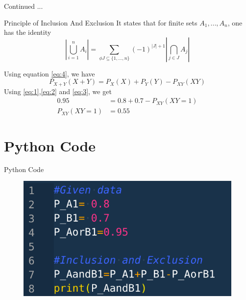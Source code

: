 \documentclass{beamer}
\begin{document}
\begin{frame}{Continued ...}
        \begin{alertblock}{Principle of Inclusion And Exclusion}
           It states that for finite sets $ A_1,...,A_n$, one has the identity\\
           \begin{equation}
               \left| \bigcup_{i=1}^n A_i \right| = \sum_{\phi J \subseteq \{1,\ldots,n \}} (-1)^{|J|+1} \left| \bigcap_{j \in J} A_j \right| \label{eq:4}
           \end{equation}
        \end{alertblock}
        \begin{block}{}
            Using equation \eqref{eq:4}, we have \\
            \begin{equation}
                P_{X+Y}(X+Y) = P_X(X) + P_Y(Y) - P_{XY}(XY)
            \end{equation}
            Using \eqref{eq:1},\eqref{eq:2} and \eqref{eq:3}, we get
            \begin{align}
                0.95 &= 0.8 + 0.7 -P_{XY}(XY = 1) \\
                P_{XY}(XY = 1) &= 0.55
            \end{align}

        \end{block}
        
\end{frame}

\section{Python Code}
\begin{frame}{Python Code}
    

\begin{figure}
    \centering
    \includegraphics[scale = 0.4]{./python.png}
\end{figure}
\end{frame}
\end{document}
